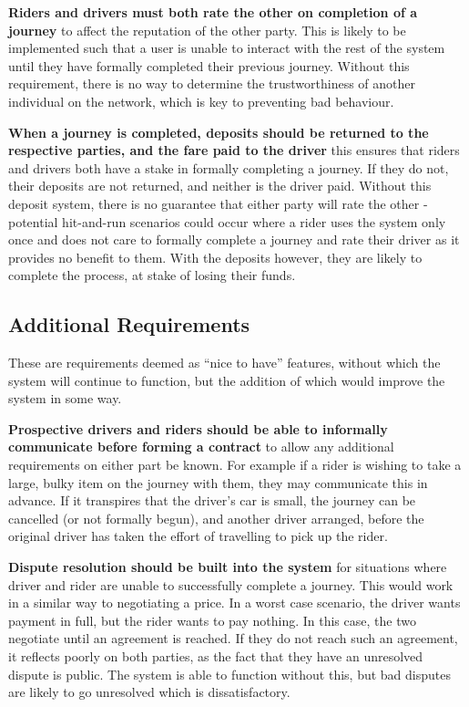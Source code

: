 \bigskip\textbf{Riders and drivers must both rate the other on completion of a journey} to affect the reputation of the other party. This is likely to be implemented such that a user is unable to interact with the rest of the system until they have formally completed their previous journey. Without this requirement, there is no way to determine the trustworthiness of another individual on the network, which is key to preventing bad behaviour.

\bigskip\textbf{When a journey is completed, deposits should be returned to the respective parties, and the fare paid to the driver} this ensures that riders and drivers both have a stake in formally completing a journey. If they do not, their deposits are not returned, and neither is the driver paid. Without this deposit system, there is no guarantee that either party will rate the other - potential hit-and-run scenarios could occur where a rider uses the system only once and does not care to formally complete a journey and rate their driver as it provides no benefit to them. With the deposits however, they are likely to complete the process, at stake of losing their funds.

\subsection{Additional Requirements}

These are requirements deemed as \enquote{nice to have} features, without which the system will continue to function, but the addition of which would improve the system in some way.

\bigskip\textbf{Prospective drivers and riders should be able to informally communicate before forming a contract} to allow any additional requirements on either part be known. For example if a rider is wishing to take a large, bulky item on the journey with them, they may communicate this in advance. If it transpires that the driver's car is small, the journey can be cancelled (or not formally begun), and another driver arranged, before the original driver has taken the effort of travelling to pick up the rider.

\bigskip\textbf{Dispute resolution should be built into the system} for situations where driver and rider are unable to successfully complete a journey. This would work in a similar way to negotiating a price. In a worst case scenario, the driver wants payment in full, but the rider wants to pay nothing. In this case, the two negotiate until an agreement is reached. If they do not reach such an agreement, it reflects poorly on both parties, as the fact that they have an unresolved dispute is public. The system is able to function without this, but bad disputes are likely to go unresolved which is dissatisfactory.
